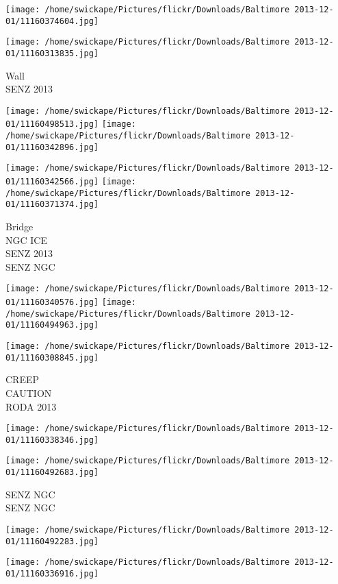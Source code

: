 \documentclass[10pt,letterpaper]{article}
\begin{document}
\texttt{[image: /home/swickape/Pictures/flickr/Downloads/Baltimore 2013-12-01/11160374604.jpg]}

\vspace{0.25in}
\texttt{[image: /home/swickape/Pictures/flickr/Downloads/Baltimore 2013-12-01/11160313835.jpg]}

Wall\\
SENZ 2013
\pagebreak

\texttt{[image: /home/swickape/Pictures/flickr/Downloads/Baltimore 2013-12-01/11160498513.jpg]}
\texttt{[image: /home/swickape/Pictures/flickr/Downloads/Baltimore 2013-12-01/11160342896.jpg]}

\texttt{[image: /home/swickape/Pictures/flickr/Downloads/Baltimore 2013-12-01/11160342566.jpg]}
\texttt{[image: /home/swickape/Pictures/flickr/Downloads/Baltimore 2013-12-01/11160371374.jpg]}

Bridge\\
NGC ICE\\
SENZ 2013\\
SENZ NGC
\pagebreak

\texttt{[image: /home/swickape/Pictures/flickr/Downloads/Baltimore 2013-12-01/11160340576.jpg]}
\texttt{[image: /home/swickape/Pictures/flickr/Downloads/Baltimore 2013-12-01/11160494963.jpg]}

\texttt{[image: /home/swickape/Pictures/flickr/Downloads/Baltimore 2013-12-01/11160308845.jpg]}

CREEP\\
CAUTION\\
RODA 2013
\pagebreak

\texttt{[image: /home/swickape/Pictures/flickr/Downloads/Baltimore 2013-12-01/11160338346.jpg]}

\vspace{0.25in}
\texttt{[image: /home/swickape/Pictures/flickr/Downloads/Baltimore 2013-12-01/11160492683.jpg]}

SENZ NGC\\
SENZ NGC
\pagebreak

\texttt{[image: /home/swickape/Pictures/flickr/Downloads/Baltimore 2013-12-01/11160492283.jpg]}

\vspace{0.25in}
\texttt{[image: /home/swickape/Pictures/flickr/Downloads/Baltimore 2013-12-01/11160336916.jpg]}
\end{document}
